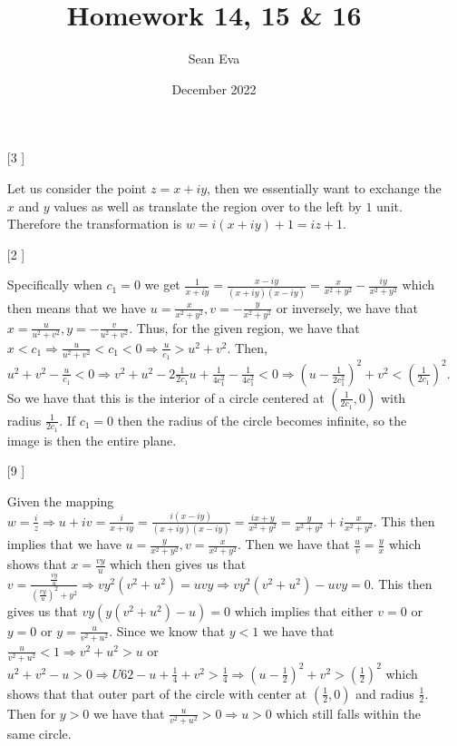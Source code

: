 \documentclass{article}
\title{Homework 14, 15 \& 16}
\author{Sean Eva}
\date{December 2022}
\theoremstyle{definition}
\begin{document}
\maketitle

\begin{enumerate}
    \item [[\phantom{-}3]]

    Let us consider the point $z = x + iy$, then we essentially want to exchange the $x$ and $y$ values as well as translate the region over to the left by $1$ unit. Therefore the transformation is $w = i(x + iy) + 1 = iz + 1.$

    \item [[\phantom{-}2]]

    Specifically when $c_1 = 0$ we get $\frac{1}{x + iy} = \frac{x-iy}{(x + iy)(x - iy)} = \frac{x}{x^2 + y^2} - \frac{iy}{x^2 + y^2}$ which then means that we have $u = \frac{x}{x^2 + y^2}, v= -\frac{y}{x^2 + y^2}$ or inversely, we have that $x = \frac{u}{u^2 + v^2}, y = -\frac{v}{u^2 + v^2}$. Thus, for the given region, we have that $x < c_1 \Rightarrow \frac{u}{u^2 + v^2} < c_1 < 0 \Rightarrow \frac{u}{c_1} > u^2 + v^2$. Then, $u^2 + v^2 - \frac{u}{c_1} < 0 \Rightarrow v^2 + u^2 - 2\frac{1}{2c_1}u + \frac{1}{4c_1^2} - \frac{1}{4c_1^2} < 0 \Rightarrow (u-\frac{1}{2c_1^2})^2 + v^2 < (\frac{1}{2c_1})^2.$ So we have that this is the  interior of a circle centered at $(\frac{1}{2c_1}, 0)$ with radius $\frac{1}{2c_1}$. If $c_1 = 0$ then the radius of the circle becomes infinite, so the image is then the entire plane.

    \item [[\phantom{-}9]]

    Given the mapping $w = \frac{i}{z} \Rightarrow u + iv = \frac{i}{x + iy} = \frac{i(x - iy)}{(x + iy)(x - iy)} = \frac{ix + y}{x^2 + y^2} = \frac{y}{x^2 + y^2} + i\frac{x}{x^2 + y^2}$. This then implies that we have $u = \frac{y}{x^2 + y^2}, v = \frac{x}{x^2 + y^2}$. Then we have that $\frac{u}{v} = \frac{y}{x}$ which shows that $x = \frac{vy}{u}$ which then gives us that $v = \frac{\frac{vy}{u}}{(\frac{vy}{u})^2 + y^2} \Rightarrow vy^2(v^2 + u^2) = uvy \Rightarrow vy^2(v^2 + u^2) - uvy = 0$. This then gives us that $vy(y(v^2 + u^2) - u) = 0$ which implies that either $v = 0$ or $y = 0$ or $y = \frac{u}{v^2 + u^2}$. Since we know that $y < 1$ we have that $\frac{u}{v^2 + u^2} < 1 \Rightarrow v^2 + u^2 > u$ or $u^2 + v ^2 - u > 0 \Rightarrow U62 - u + \frac{1}{4} + v^2 > \frac{1}{4} \Rightarrow (u - \frac{1}{2})^2 + v^2 > (\frac{1}{2})^2$ which shows that that outer part of the circle with center at $(\frac{1}{2}, 0)$ and radius $\frac{1}{2}.$ Then for $y > 0$ we have that $\frac{u}{v^2 + u^2} > 0 \Rightarrow u > 0$ which still falls within the same circle.


\end{enumerate}
\end{document}
